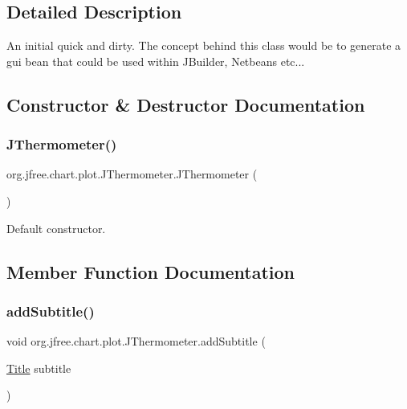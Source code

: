 \subsection{Detailed Description}
An initial quick and dirty. The concept behind this class would be to generate a gui bean that could be used within J\+Builder, Netbeans etc... 

\subsection{Constructor \& Destructor Documentation}
\mbox{\label{classorg_1_1jfree_1_1chart_1_1plot_1_1_j_thermometer_ac14cf2a3cc450160b4698bfc2c8ee973}} 
\subsubsection{\texorpdfstring{J\+Thermometer()}{JThermometer()}}
{\footnotesize\ttfamily org.\+jfree.\+chart.\+plot.\+J\+Thermometer.\+J\+Thermometer (\begin{DoxyParamCaption}{ }\end{DoxyParamCaption})}

Default constructor. 

\subsection{Member Function Documentation}
\mbox{\label{classorg_1_1jfree_1_1chart_1_1plot_1_1_j_thermometer_a279884f8bdd616f48989958751eb6ae3}} 
\subsubsection{\texorpdfstring{add\+Subtitle()}{addSubtitle()}\hspace{0.1cm}{\footnotesize\ttfamily [1/3]}}
{\footnotesize\ttfamily void org.\+jfree.\+chart.\+plot.\+J\+Thermometer.\+add\+Subtitle (\begin{DoxyParamCaption}\item[{\mbox{\hyperlink{classorg_1_1jfree_1_1chart_1_1title_1_1_title}{Title}}}]{subtitle }\end{DoxyParamCaption})}

